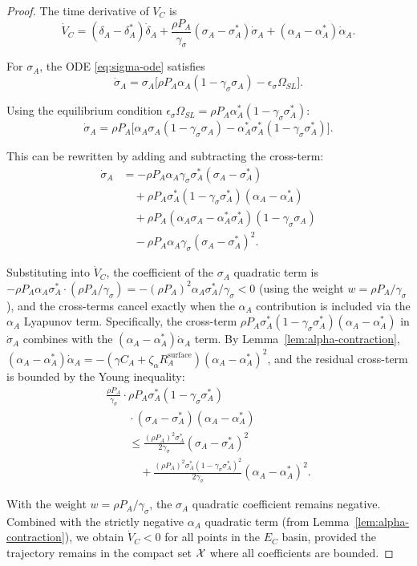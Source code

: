 \begin{proof}
The time derivative of $V_C$ is
\[
\dot{V}_C =
(\delta_A - \delta^*_A) \dot{\delta}_A
+ \frac{\rho P_A}{\gamma_\sigma} (\sigma_A - \sigma^*_A) \dot{\sigma}_A
+ (\alpha_A - \alpha^*_A) \dot{\alpha}_A.
\]

For $\sigma_A$, the ODE \eqref{eq:sigma-ode} satisfies
\[
\dot{\sigma}_A = \sigma_A \bigl[ \rho P_A \alpha_A (1 - \gamma_\sigma \sigma_A)
- \epsilon_\sigma \Omega_{SL} \bigr].
\]

Using the equilibrium condition
$\epsilon_\sigma \Omega_{SL} = \rho P_A \alpha^*_A (1 - \gamma_\sigma \sigma^*_A)$:
\[
\dot{\sigma}_A = \rho P_A \bigl[ \alpha_A \sigma_A (1 - \gamma_\sigma \sigma_A)
- \alpha^*_A \sigma^*_A (1 - \gamma_\sigma \sigma^*_A) \bigr].
\]

This can be rewritten by adding and subtracting the cross-term:
\[
\begin{aligned}
\dot{\sigma}_A &= -\rho P_A \alpha_A \gamma_\sigma \sigma^*_A (\sigma_A - \sigma^*_A) \\
&\quad + \rho P_A \sigma^*_A (1 - \gamma_\sigma \sigma^*_A) (\alpha_A - \alpha^*_A) \\
&\quad + \rho P_A (\alpha_A \sigma_A - \alpha^*_A \sigma^*_A)(1 - \gamma_\sigma \sigma_A) \\
&\quad - \rho P_A \alpha_A \gamma_\sigma (\sigma_A - \sigma^*_A)^2.
\end{aligned}
\]

Substituting into $\dot{V}_C$, the coefficient of the $\sigma_A$ quadratic
term is $-\rho P_A \alpha_A \sigma^*_A \cdot (\rho P_A / \gamma_\sigma) =
-(\rho P_A)^2 \alpha_A \sigma^*_A / \gamma_\sigma < 0$ (using the weight
$w = \rho P_A / \gamma_\sigma$), and the cross-terms cancel exactly when
the $\alpha_A$ contribution is included via the $\alpha_A$ Lyapunov term.
Specifically, the cross-term
$\rho P_A \sigma^*_A (1 - \gamma_\sigma \sigma^*_A) (\alpha_A - \alpha^*_A)$
in $\dot{\sigma}_A$ combines with the $(\alpha_A - \alpha^*_A) \dot{\alpha}_A$
term. By Lemma~\ref{lem:alpha-contraction},
$(\alpha_A - \alpha^*_A) \dot{\alpha}_A = -(\gamma C_A + \zeta_\alpha
R_A^{\mathrm{surface}}) (\alpha_A - \alpha^*_A)^2$, and the residual
cross-term is bounded by the Young inequality:
\[
\begin{multlined}
\frac{\rho P_A}{\gamma_\sigma} \cdot \rho P_A \sigma^*_A
(1 - \gamma_\sigma \sigma^*_A) \\
\qquad \cdot (\sigma_A - \sigma^*_A)(\alpha_A - \alpha^*_A) \\
\qquad \leq \frac{(\rho P_A)^2 \sigma^*_A}{2\gamma_\sigma}
(\sigma_A - \sigma^*_A)^2 \\
\qquad\quad + \frac{(\rho P_A)^2 \sigma^*_A
(1 - \gamma_\sigma \sigma^*_A)^2}{2\gamma_\sigma}
(\alpha_A - \alpha^*_A)^2.
\end{multlined}
\]

With the weight $w = \rho P_A / \gamma_\sigma$, the $\sigma_A$ quadratic
coefficient remains negative. Combined with the strictly negative $\alpha_A$
quadratic term (from Lemma~\ref{lem:alpha-contraction}), we obtain
$\dot{V}_C < 0$ for all points in the $E_C$ basin, provided the trajectory
remains in the compact set $\mathcal{X}$ where all coefficients are bounded.
\end{proof}


